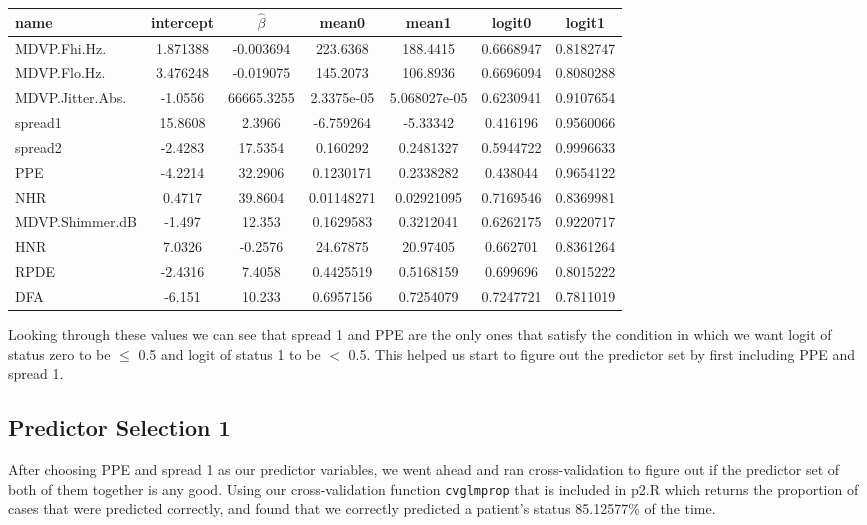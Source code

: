 \documentclass{article}
\begin{document}
\begin{table}[h]
  \centering
\begin{tabular}{|l|c|c|c|c|c|c|}
\hline
name & intercept & $\hat{\beta}$ & mean0 & mean1 & logit0 & logit1 \\
\hline
MDVP.Fhi.Hz. & 1.871388 & -0.003694 & 223.6368 & 188.4415 & 0.6668947 & 0.8182747 \\
\hline
MDVP.Flo.Hz. & 3.476248 & -0.019075 & 145.2073 & 106.8936 & 0.6696094 & 0.8080288 \\
\hline
MDVP.Jitter.Abs. & -1.0556 & 66665.3255 & 2.3375e-05 & 5.068027e-05 & 0.6230941 & 0.9107654 \\
\hline
spread1 & 15.8608 & 2.3966 & -6.759264 & -5.33342 & 0.416196 & 0.9560066 \\
\hline
spread2 & -2.4283 & 17.5354 & 0.160292 & 0.2481327 & 0.5944722 & 0.9996633 \\
\hline
PPE & -4.2214 & 32.2906 & 0.1230171 & 0.2338282 & 0.438044 & 0.9654122 \\
\hline
NHR & 0.4717 & 39.8604 & 0.01148271 & 0.02921095 & 0.7169546 & 0.8369981 \\
\hline
MDVP.Shimmer.dB & -1.497 & 12.353 & 0.1629583 & 0.3212041 & 0.6262175 & 0.9220717 \\
\hline
HNR & 7.0326 & -0.2576 & 24.67875 & 20.97405 & 0.662701 & 0.8361264 \\
\hline
RPDE & -2.4316 & 7.4058 & 0.4425519 & 0.5168159 & 0.699696 & 0.8015222 \\
\hline
DFA & -6.151 & 10.233 & 0.6957156 & 0.7254079 & 0.7247721 & 0.7811019 \\
\hline
\end{tabular}
\end{table}

Looking through these values we can see that spread 1 and PPE are the only
ones that satisfy the condition in which we want logit of status zero to
be $\leq$ 0.5 and logit of status 1 to be $<$ 0.5. This helped us start to
figure out the predictor set by first including PPE and spread 1.

\subsection{Predictor Selection 1}

After choosing PPE and spread 1 as our predictor variables, we went ahead and
ran cross-validation to figure out if the predictor set of both of them
together is any good. Using our cross-validation function \verb+cvglmprop+
that is included in p2.R which returns the proportion of cases that were
predicted correctly, and found that we correctly predicted a patient's
status 85.12577\% of the time.
\end{document}
